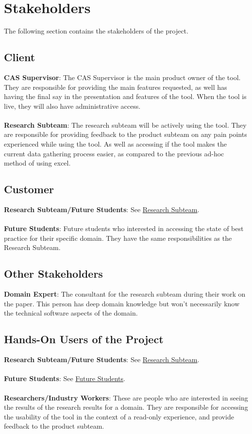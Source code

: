 \documentclass[12pt]{article}
\begin{document}
\section{Stakeholders}
The following section contains the stakeholders of the project.
\subsection{Client}
\textbf{CAS Supervisor}: The CAS Supervisor is the main product owner of the tool. They are responsible for providing the main features requested, as well has having the final say in the presentation and features of the tool. When the tool is live, they will also have administrative access.
\\\\\textbf{Research Subteam}\label{research_subteam_client}: The research subteam will be actively using the tool. They are responsible for providing feedback to the product subteam on any pain points experienced while using the tool.
As well as accessing if the tool makes the current data gathering process easier, as compared to the previous ad-hoc method of using excel.
\subsection{Customer}
\textbf{Research Subteam/Future Students}: See \hyperref[research_subteam_client]{Research Subteam}.\\
\\\textbf{Future Students}\label{future_students}: Future students who interested in accessing the state of best practice for their specific domain. They have the same responsibilities as the Research Subteam.
\subsection{Other Stakeholders}
\textbf{Domain Expert}: The consultant for the research subteam during their work on the paper. This person has deep domain knowledge but won't necessarily know the technical software aspects of the domain.
\subsection{Hands-On Users of the Project}
\textbf{Research Subteam/Future Students}: See \hyperref[research_subteam_client]{Research Subteam}.\\\\
\textbf{Future Students}: See \hyperref[future_students]{Future Students}.\\\\
\textbf{Researchers/Industry Workers}: These are people who are interested in seeing the results of the research results for a domain. They are responsible for accessing the usability of the tool in the context of a read-only experience, and provide feedback to the product subteam.
\end{document}
